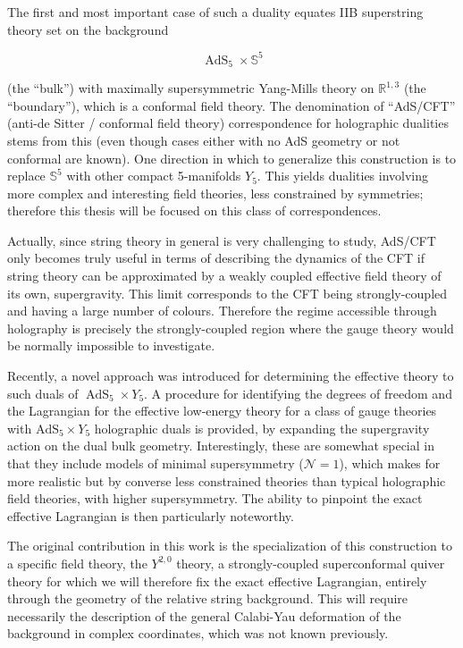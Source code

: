 The first and most important case of such a duality\cite{Maldacena} equates IIB superstring theory set on the background

\begin{equation}
	\operatorname{AdS}_5 \times \mathbb{S}^5
\end{equation}

(the ``bulk'') with maximally supersymmetric Yang-Mills theory on $\mathbb{R}^{1,3}$ (the ``boundary''), which is a conformal field theory. The denomination of ``AdS/CFT'' (anti-de Sitter / conformal field theory) correspondence for holographic dualities stems from this (even though cases either with no AdS geometry or not conformal are known). One direction in which to generalize this construction is to replace $\mathbb{S}^5$ with other compact 5-manifolds $Y_5$. This yields dualities involving more complex and interesting field theories, less constrained by symmetries; therefore this thesis will be focused on this class of correspondences.

Actually, since string theory in general is very challenging to study, AdS/CFT only becomes truly useful in terms of describing the dynamics of the CFT if string theory can be approximated by a weakly coupled effective field theory of its own, supergravity. This limit corresponds to the CFT being strongly-coupled and having a large number of colours. Therefore the regime accessible through holography is precisely the strongly-coupled region where the gauge theory would be normally impossible to investigate.

Recently, a novel approach was introduced\cite{MZ} for determining the effective theory to such duals of $\operatorname{AdS}_5 \times Y_5$. A procedure for identifying the degrees of freedom and the Lagrangian for the effective low-energy theory for a class of gauge theories with $\operatorname{AdS_5} \times Y_5$ holographic duals is provided, by expanding the supergravity action on the dual bulk geometry. Interestingly, these are somewhat special in that they include models of minimal supersymmetry ($\mathcal{N}=1$), which makes for more realistic but by converse less constrained theories than typical holographic field theories, with higher supersymmetry. The ability to pinpoint the exact effective Lagrangian is then particularly noteworthy.

The original contribution in this work is the specialization of this construction to a specific field theory, the $Y^{2,0}$ theory, a strongly-coupled superconformal quiver theory for which we will therefore fix the exact effective Lagrangian, entirely through the geometry of the relative string background. This will require necessarily the description of the general Calabi-Yau deformation of the background in complex coordinates, which was not known previously.

